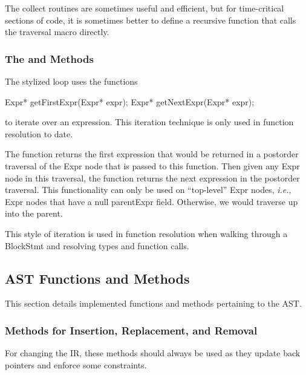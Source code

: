 \documentclass[10pt]{article}
\newcommand{\ie}{\emph{i.e.}}
\begin{document}
The collect routines are sometimes useful and efficient, but for
time-critical sections of code, it is sometimes better to define a
recursive function that calls the traversal macro
 directly.

\subsubsection{The  and  Methods}

The stylized loop  uses the functions
\begin{clang}
Expr* getFirstExpr(Expr* expr);
Expr* getNextExpr(Expr* expr);
\end{clang}
to iterate over an expression.  This iteration technique is only used
in function resolution to date.

The function  returns the first expression that would
be returned in a postorder traversal of the Expr node that is passed
to this function.  Then given any Expr node in this traversal, the
function  returns the next expression in the postorder
traversal.  This functionality can only be used on ``top-level'' Expr
nodes, \ie, Expr nodes that have a null parentExpr field.  Otherwise,
we would traverse up into the parent.

This style of iteration is used in function resolution when walking
through a BlockStmt and resolving types and function calls.

\subsection{AST Functions and Methods}

This section details implemented functions and methods pertaining to
the AST.

\subsubsection{Methods for Insertion, Replacement, and Removal}
\label{sec:inserts}

For changing the IR, these methods should always be used as they
update back pointers and enforce some constraints.
\end{document}
